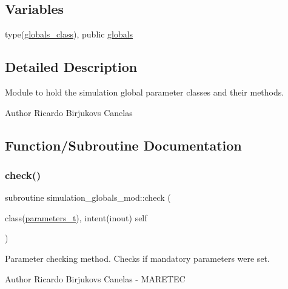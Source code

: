 \subsection*{Variables}
\begin{DoxyCompactItemize}
\item 
type(\hyperlink{structsimulation__globals__mod_1_1globals__class}{globals\+\_\+class}), public \hyperlink{namespacesimulation__globals__mod_a04123075b6de525703edb89697fc39e9}{globals}
\end{DoxyCompactItemize}


\subsection{Detailed Description}
Module to hold the simulation global parameter classes and their methods. 

\begin{DoxyAuthor}{Author}
Ricardo Birjukovs Canelas 
\end{DoxyAuthor}


\subsection{Function/\+Subroutine Documentation}
\mbox{\label{namespacesimulation__globals__mod_a41249abb5c33ef9e8bff448f0b3826fa}} 
\subsubsection{\texorpdfstring{check()}{check()}}
{\footnotesize\ttfamily subroutine simulation\+\_\+globals\+\_\+mod\+::check (\begin{DoxyParamCaption}\item[{class(\hyperlink{structsimulation__globals__mod_1_1parameters__t}{parameters\+\_\+t}), intent(inout)}]{self }\end{DoxyParamCaption})\hspace{0.3cm}{\ttfamily [private]}}



Parameter checking method. Checks if mandatory parameters were set. 

\begin{DoxyAuthor}{Author}
Ricardo Birjukovs Canelas -\/ M\+A\+R\+E\+T\+EC 
\end{DoxyAuthor}
\mbox{\label{namespacesimulation__globals__mod_a68e871ed8e5d3930884e968c6fdafddc}} 
